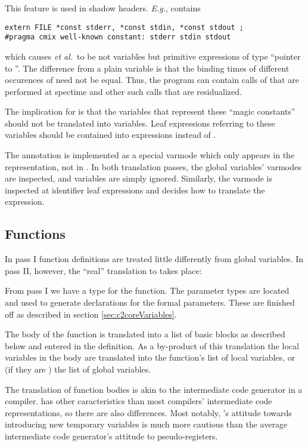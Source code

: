 \begin{docpart}
This feature is used in shadow headers. \emph{E.g.},
 contains
\begin{verbatim}
extern FILE *const stderr, *const stdin, *const stdout ;
#pragma cmix well-known constant: stderr stdin stdout
\end{verbatim}
which causes  \emph{et al.}\ to be not
variables but primitive expressions of type ``pointer to
''. The difference from a plain  variable
is that the binding times of different occurences of 
need not be equal. Thus, the program can contain calls of
 that are performed
at spectime and other such calls that are residualized.

The implication for \ctoc is that the \ansiC variables that represent
these ``magic constants'' should not be translated into \coreC
variables. Leaf expressions referring to these variables
should be contained into  expressions instead of
.

The annotation is implemented as a special varmode 
which only appears in the \ansiC representation, not in \coreC.
In both translation passes, the global variables' varmodes are
inspected, and  variables are simply ignored.
Similarly, the varmode is inspected at identifier leaf expressions
and decides how to translate the expression.

\subsection{Functions}
In pass I function definitions are treated little differently from
global variables. In pass II, however, the ``real'' translation to
\coreC takes place:

From pass I we have a \coreC type for the function. The parameter
types are located and used to generate \coreC declarations for
the formal parameters. These are finished off as described in
section \ref{sec:c2coreVariables}.

The body of the function is translated into a list of basic blocks as
described below and entered in the \coreC definition. As a by-product
of this translation the local variables in the body are translated
into the function's list of local variables, or (if they are
) the list of global variables.

The translation of function bodies is akin to the intermediate
code generator in a compiler. \coreC has other caracteristics
than most compilers' intermediate code representations, so there
are also differences.
Most notably, \ctoc's attitude towards introducing new temporary
variables is much more cautious than the average intermediate code
generator's attitude to pseudo-registers.


\end{docpart}
